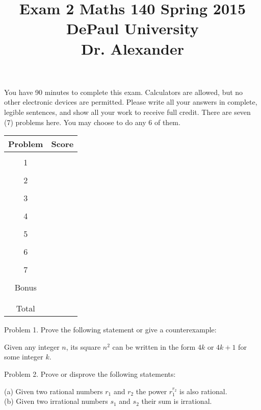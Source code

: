 \documentclass[16 pt]{amsart}
\theoremstyle{definition}
\theoremstyle{remark}
\numberwithin{equation}{subsection}
\begin{document}
\title{Exam 2 Maths 140 Spring 2015 \\ DePaul University\\Dr. Alexander}
\maketitle
You have 90 minutes to complete this exam.  Calculators are allowed, but no other electronic devices are permitted.  Please write all your answers in complete, legible sentences, and show all your work to receive full credit.  There are seven (7) problems here.  You may choose to do any 6 of them.  
\vspace{1in}


\begin{center}
  \begin{tabular}{ c | c }
    Problem & Score\\
    \hline
    &\\
    1&\\
    &\\
    2&\\
    &\\
    3&\\
    &\\
    4&\\
    &\\
    5&\\
    &\\
    6&\\
    &\\
    7&\\
    &\\
    Bonus&\\
    &\\
    \hline 
    &\\    
    Total& 
 \end{tabular}
\end{center}

\newpage 
Problem 1. Prove the following statement or give a counterexample:

Given any integer $n$, its square $n^2$ can be written in the form $4k$ or $4k+1$ for some integer $k$.





\newpage
Problem 2. Prove or disprove the following statements:

(a) Given two rational numbers $r_1$ and $r_2$ the power $r_1^{r_2}$ is also rational.\\

(b) Given two irrational numbers $s_1$ and $s_2$ their sum is irrational.
\end{document}
